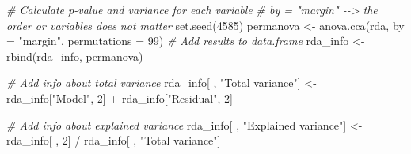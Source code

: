 \documentclass[
]{book}
\newenvironment{Shaded}{\begin{snugshade}}{\end{snugshade}}
\newcommand{\AttributeTok}[1]{\textcolor[rgb]{0.77,0.63,0.00}{#1}}
\newcommand{\CommentTok}[1]{\textcolor[rgb]{0.56,0.35,0.01}{\textit{#1}}}
\newcommand{\DecValTok}[1]{\textcolor[rgb]{0.00,0.00,0.81}{#1}}
\newcommand{\FunctionTok}[1]{\textcolor[rgb]{0.00,0.00,0.00}{#1}}
\newcommand{\NormalTok}[1]{#1}
\newcommand{\OtherTok}[1]{\textcolor[rgb]{0.56,0.35,0.01}{#1}}
\newcommand{\SpecialCharTok}[1]{\textcolor[rgb]{0.00,0.00,0.00}{#1}}
\newcommand{\StringTok}[1]{\textcolor[rgb]{0.31,0.60,0.02}{#1}}
\begin{document}
\begin{Shaded}
\begin{Highlighting}[]
\CommentTok{\# Calculate p{-}value and variance for each variable}
\CommentTok{\# by = "margin" {-}{-}\textgreater{} the order or variables does not matter}
\FunctionTok{set.seed}\NormalTok{(}\DecValTok{4585}\NormalTok{)}
\NormalTok{permanova }\OtherTok{\textless{}{-}} \FunctionTok{anova.cca}\NormalTok{(rda, }\AttributeTok{by =} \StringTok{"margin"}\NormalTok{,  }\AttributeTok{permutations =} \DecValTok{99}\NormalTok{)}
\CommentTok{\# Add results to data.frame}
\NormalTok{rda\_info }\OtherTok{\textless{}{-}} \FunctionTok{rbind}\NormalTok{(rda\_info, permanova)}

\CommentTok{\# Add info about total variance}
\NormalTok{rda\_info[ , }\StringTok{"Total variance"}\NormalTok{] }\OtherTok{\textless{}{-}}\NormalTok{ rda\_info[}\StringTok{"Model"}\NormalTok{, }\DecValTok{2}\NormalTok{] }\SpecialCharTok{+}
\NormalTok{    rda\_info[}\StringTok{"Residual"}\NormalTok{, }\DecValTok{2}\NormalTok{]}

\CommentTok{\# Add info about explained variance}
\NormalTok{rda\_info[ , }\StringTok{"Explained variance"}\NormalTok{] }\OtherTok{\textless{}{-}}\NormalTok{ rda\_info[ , }\DecValTok{2}\NormalTok{] }\SpecialCharTok{/} 
\NormalTok{    rda\_info[ , }\StringTok{"Total variance"}\NormalTok{]}


\end{Highlighting}
\end{Shaded}
\end{document}
